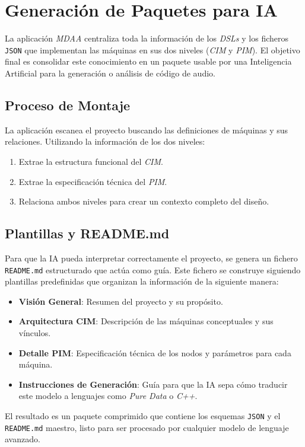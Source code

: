 \chapter{Generación de Paquetes para IA}

La aplicación \textit{MDAA} centraliza toda la información de los \textit{DSLs} y los ficheros \texttt{JSON} que implementan las máquinas en sus dos niveles (\textit{CIM} y \textit{PIM}). El objetivo final es consolidar este conocimiento en un paquete usable por una Inteligencia Artificial para la generación o análisis de código de audio.

\section{Proceso de Montaje}

La aplicación escanea el proyecto buscando las definiciones de máquinas y sus relaciones. Utilizando la información de los dos niveles:
\begin{enumerate}
    \item Extrae la estructura funcional del \textit{CIM}.
    \item Extrae la especificación técnica del \textit{PIM}.
    \item Relaciona ambos niveles para crear un contexto completo del diseño.
\end{enumerate}

\section{Plantillas y README.md}

Para que la IA pueda interpretar correctamente el proyecto, se genera un fichero \texttt{README.md} estructurado que actúa como guía. Este fichero se construye siguiendo plantillas predefinidas que organizan la información de la siguiente manera:

\begin{itemize}
    \item \textbf{Visión General}: Resumen del proyecto y su propósito.
    \item \textbf{Arquitectura CIM}: Descripción de las máquinas conceptuales y sus vínculos.
    \item \textbf{Detalle PIM}: Especificación técnica de los nodos y parámetros para cada máquina.
    \item \textbf{Instrucciones de Generación}: Guía para que la IA sepa cómo traducir este modelo a lenguajes como \textit{Pure Data} o \textit{C++}.
\end{itemize}

El resultado es un paquete comprimido que contiene los esquemas \texttt{JSON} y el \texttt{README.md} maestro, listo para ser procesado por cualquier modelo de lenguaje avanzado.
